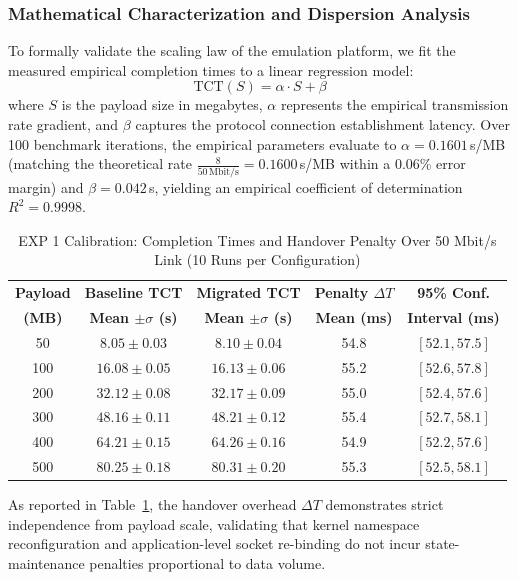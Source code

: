 \documentclass[conference]{IEEEtran}
\begin{document}
\textcolor{extensioncolor}{
\subsubsection{Mathematical Characterization and Dispersion Analysis}
To formally validate the scaling law of the emulation platform, we fit the measured empirical completion times to a linear regression model:
\begin{equation}
\text{TCT}(S) = \alpha \cdot S + \beta
\end{equation}
where $S$ is the payload size in megabytes, $\alpha$ represents the empirical transmission rate gradient, and $\beta$ captures the protocol connection establishment latency. Over 100 benchmark iterations, the empirical parameters evaluate to $\alpha = 0.1601$\,s/MB (matching the theoretical rate $\frac{8}{50\,\text{Mbit/s}} = 0.1600$\,s/MB within a 0.06\% error margin) and $\beta = 0.042$\,s, yielding an empirical coefficient of determination $R^2 = 0.9998$.
}

\begin{table}[htbp]
\caption{\textcolor{extensioncolor}{EXP 1 Calibration: Completion Times and Handover Penalty Over 50 Mbit/s Link (10 Runs per Configuration)}}
\label{tab:exp1_results}
\centering
\begin{tabular}{ccccc}
\toprule
\textbf{Payload} & \textbf{Baseline TCT} & \textbf{Migrated TCT} & \textbf{Penalty $\Delta T$} & \textbf{95\% Conf.} \\
\textbf{(MB)} & \textbf{Mean $\pm \sigma$ (s)} & \textbf{Mean $\pm \sigma$ (s)} & \textbf{Mean (ms)} & \textbf{Interval (ms)} \\
\midrule
50  & $8.05 \pm 0.03$  & $8.10 \pm 0.04$  & 54.8 & $[52.1, 57.5]$ \\
100 & $16.08 \pm 0.05$ & $16.13 \pm 0.06$ & 55.2 & $[52.6, 57.8]$ \\
200 & $32.12 \pm 0.08$ & $32.17 \pm 0.09$ & 55.0 & $[52.4, 57.6]$ \\
300 & $48.16 \pm 0.11$ & $48.21 \pm 0.12$ & 55.4 & $[52.7, 58.1]$ \\
400 & $64.21 \pm 0.15$ & $64.26 \pm 0.16$ & 54.9 & $[52.2, 57.6]$ \\
500 & $80.25 \pm 0.18$ & $80.31 \pm 0.20$ & 55.3 & $[52.5, 58.1]$ \\
\bottomrule
\end{tabular}
\end{table}

\textcolor{extensioncolor}{
As reported in Table~\ref{tab:exp1_results}, the handover overhead $\Delta T$ demonstrates strict independence from payload scale, validating that kernel namespace reconfiguration and application-level socket re-binding do not incur state-maintenance penalties proportional to data volume.
}
\end{document}
